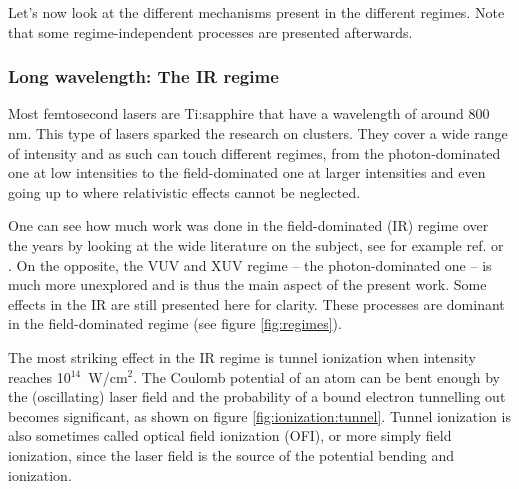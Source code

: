 Let's now look at the different mechanisms present in the different regimes.
Note that some regime-independent processes are presented afterwards.



\subsubsection{Long wavelength: The IR regime}
\label{section:intro:mechanisms:ir}

Most femtosecond lasers are Ti:sapphire that have a wavelength of around 800 nm.
This type of lasers sparked the research on clusters. They cover a wide range of
intensity and as such can touch different regimes, from the photon-dominated
one at low intensities to the field-dominated one at larger intensities and
even going up to where relativistic effects cannot be neglected.

One can see how much work was done in the field-dominated (IR) regime over the
years by looking at the wide literature on the subject, see for example ref.
\cite{Fennel2010} or \cite{Ramunno2008}. On the opposite, the VUV and XUV regime
-- the photon-dominated one -- is much more unexplored and is thus the main
aspect of the present work. Some effects in the IR are still presented here
for clarity. These processes are dominant in the field-dominated regime (see
figure \ref{fig:regimes}).



The most striking effect in the IR regime is tunnel
ionization\cite[Chapter~3]{Brabec2009} when intensity reaches 10$^{14}$~W/cm$^2$.
The Coulomb potential of an atom can be bent enough by the (oscillating) laser
field and the probability of a bound electron tunnelling out becomes significant,
as shown on figure \ref{fig:ionization:tunnel}. Tunnel ionization is also
sometimes called optical field ionization (OFI), or more simply field
ionization, since the laser field is the source of the potential bending and
ionization.

